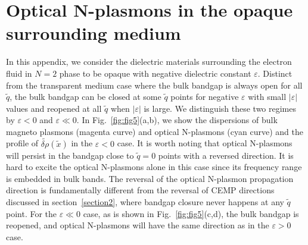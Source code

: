 \documentclass[%
reprint,
amsmath,amssymb,
aps,superscriptaddress
]{revtex4-2}
\begin{document}
\section{Optical N-plasmons in the opaque surrounding medium}

In this appendix, we consider the dielectric materials surrounding the electron fluid in $N=2$ phase to be opaque with negative dielectric constant $\varepsilon$. Distinct from the transparent medium case where the bulk bandgap is always open for all $\tilde{q}$, the bulk bandgap can be closed at some $\tilde{q}$ points for negative $\varepsilon$ with small $|\varepsilon|$ values and reopened at all $\tilde{q}$ when $|\varepsilon|$ is large. We distinguish these two regimes by $\varepsilon<0$ and $\varepsilon \ll 0$. In Fig.~\ref{fig:fig5}(a,b), we show the dispersions of bulk magneto plasmons (magenta curve) and optical N-plasmons (cyan curve) and the profile of $\widetilde{\delta \rho}(\tilde{x})$ in the $\varepsilon<0$ case. It is worth noting that optical N-plasmons will persist in the bandgap close to $\tilde{q}=0$ points with a reversed direction. It is hard to excite the optical N-plasmons alone in this case since its frequency range is embedded in bulk bands. The reversal of the optical N-plasmon propagation direction is fundamentally different from the reversal of CEMP directions discussed in section~\ref{section2}, where bandgap closure never happens at any $\tilde{q}$ point. For the $\varepsilon \ll 0$ case, as is shown in Fig.~\ref{fig:fig5}(c,d), the bulk bandgap is reopened, and optical N-plasmons will have the same direction as in the $\varepsilon > 0$ case.

\clearpage
\end{document}
